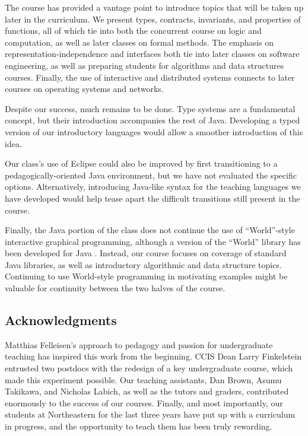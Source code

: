 \documentclass[submission,copyright]{eptcs}
\begin{document}
The course has provided a vantage point to introduce topics that will
be taken up later in the curriculum.  We present types, contracts,
invariants, and properties of functions, all of which tie into both
the concurrent course on logic and computation, as well as later
classes on formal methods.  The emphasis on
representation-independence and interfaces both tie into later classes
on software engineering, as well as preparing students for algorithms
and data structures courses.  Finally, the use of interactive and
distributed systems connects to later courses on operating systems and
networks.

Despite our success, much remains to be done.  Type systems are a
fundamental concept, but their introduction accompanies the rest of
Java.  Developing a typed version of our introductory languages would
allow a smoother introduction of this idea.  

Our class's use of Eclipse could also be improved by first
transitioning to a pedagogically-oriented Java environment, but we
have not evaluated the specific options.  Alternatively, introducing
Java-like syntax for the teaching languages we have developed would
help tease apart the difficult transitions still present in the course.

Finally, the Java portion of the class does not continue the use of
``World''-style interactive graphical programming, although a version
of the ``World'' library has been developed for Java
\cite{local:java-world}.  Instead, our course focuses on coverage of
standard Java libraries, as well as introductory algorithmic and data
structure topics.  Continuing to use World-style programming in
motivating examples might be valuable for continuity between the two
halves of the course.

\subsection*{Acknowledgments}

Matthias Felleisen's approach to pedagogy and passion for
undergraduate teaching has inspired this work from the beginning.
CCIS Dean Larry Finkelstein entrusted two postdocs with the redesign
of a key undergraduate course, which made this experiment possible.
Our teaching assistants, Dan Brown, Asumu Takikawa, and Nicholas
Labich, as well as the tutors and graders, contributed enormously to
the success of our courses. Finally, and most importantly, our
students at Northeastern for the last three years have put up with a
curriculum in progress, and the opportunity to teach them has been
truly rewarding.
\end{document}
